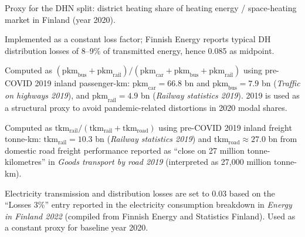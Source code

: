 \documentclass{article}
\begin{document}
\begin{table}[h!]
\begin{threeparttable}
\begin{tablenotes}\footnotesize
\item[a] Proxy for the DHN split: district heating share of heating energy / space-heating market in Finland (year 2020).
\item[b] Implemented as a constant loss factor; Finnish Energy reports typical DH distribution losses of 8--9\% of transmitted energy, hence 0.085 as midpoint.
\item[c] Computed as $(\mathrm{pkm}_{\mathrm{bus}}+\mathrm{pkm}_{\mathrm{rail}})/(\mathrm{pkm}_{\mathrm{car}}+\mathrm{pkm}_{\mathrm{bus}}+\mathrm{pkm}_{\mathrm{rail}})$ using pre-COVID 2019 inland passenger-km: $\mathrm{pkm}_{\mathrm{car}}=66.8$ bn and $\mathrm{pkm}_{\mathrm{bus}}=7.9$ bn (\emph{Traffic on highways 2019}), and $\mathrm{pkm}_{\mathrm{rail}}=4.9$ bn (\emph{Railway statistics 2019}). 2019 is used as a structural proxy to avoid pandemic-related distortions in 2020 modal shares.
\item[d] Computed as $\mathrm{tkm}_{\mathrm{rail}}/(\mathrm{tkm}_{\mathrm{rail}}+\mathrm{tkm}_{\mathrm{road}})$ using pre-COVID 2019 inland freight tonne-km: $\mathrm{tkm}_{\mathrm{rail}}=10.3$ bn (\emph{Railway statistics 2019}) and $\mathrm{tkm}_{\mathrm{road}}\approx 27.0$ bn from domestic road freight performance reported as ``close on 27 million tonne-kilometres'' in \emph{Goods transport by road 2019} (interpreted as 27,000 million tonne-km).
\item[e] Electricity transmission and distribution losses are set to 0.03 based on the ``Losses 3\%'' entry reported in the electricity consumption breakdown in \emph{Energy in Finland 2022} (compiled from Finnish Energy and Statistics Finland). Used as a constant proxy for baseline year 2020.
\end{tablenotes}
\end{threeparttable}
\end{table}
\end{document}
